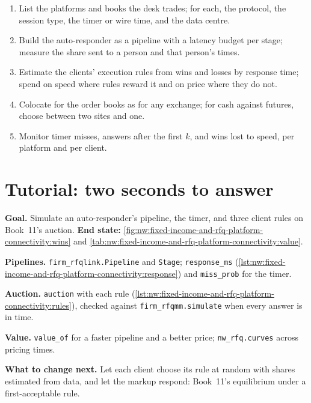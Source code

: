 \begin{method}\label{met:nw:fixed-income-and-rfq-platform-connectivity:desk}
\begin{enumerate}
\item List the platforms and books the desk trades; for each, the protocol, the session type, the timer or wire time, and the data
  centre.
\item Build the auto-responder as a pipeline with a latency budget per stage; measure the share sent to a person and that person's
  times.
\item Estimate the clients' execution rules from wins and losses by response time; spend on speed where rules reward it and on price
  where they do not.
\item Colocate for the order books as for any exchange; for cash against futures, choose between two sites and one.
\item Monitor timer misses, answers after the first $k$, and wins lost to speed, per platform and per client.
\end{enumerate}
\end{method}

\section{Tutorial: two seconds to answer}\label{tut:nw:fixed-income-and-rfq-platform-connectivity:tut}

\begin{tutorial}
\textbf{Goal.} Simulate an auto-responder's pipeline, the timer, and three client rules on Book~11's auction.
\textbf{End state:} \cref{fig:nw:fixed-income-and-rfq-platform-connectivity:wins} and
\cref{tab:nw:fixed-income-and-rfq-platform-connectivity:value}.
\begin{tutsteps}
\item \textbf{Pipelines.} \texttt{firm\_rfqlink.Pipeline} and \texttt{Stage}; \texttt{response\_ms}
  (\cref{lst:nw:fixed-income-and-rfq-platform-connectivity:response}) and \texttt{miss\_prob} for the timer.
\item \textbf{Auction.} \texttt{auction} with each rule (\cref{lst:nw:fixed-income-and-rfq-platform-connectivity:rules}), checked
  against \texttt{firm\_rfqmm.simulate} when every answer is in time.
\item \textbf{Value.} \texttt{value\_of} for a faster pipeline and a better price; \texttt{nw\_rfq.curves} across pricing times.
\end{tutsteps}
\textbf{What to change next.} Let each client choose its rule at random with shares estimated from data, and let the markup respond:
Book~11's equilibrium under a first-acceptable rule.
\end{tutorial}

